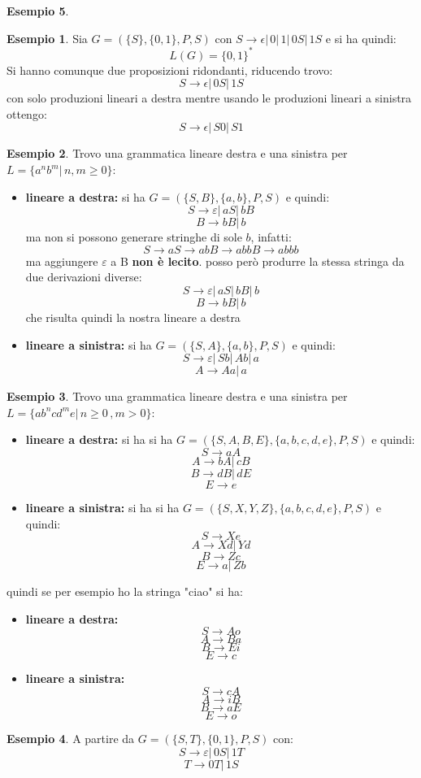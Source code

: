 \documentclass[a4paper]{book}
\theoremstyle{definition}%
\newtheorem*{esempio}{Esempio}
\begin{document}
\begin{esempio}
\begin{esempio}
Sia $G=(\{S\},\{0,1\},P,S)$ con $S\to \epsilon|\,0|\,1|\,0S|\,1S$ e si ha quindi:
\[ L(G)=\{0,1\}^* \]
Si hanno comunque due proposizioni ridondanti, riducendo trovo:
\[ S\to \epsilon|\, 0S|\,1S \]
con solo produzioni lineari a destra mentre usando le produzioni lineari a sinistra ottengo:
\[ S\to \epsilon|\, S0|\,S1 \]
\end{esempio}
\begin{esempio}
Trovo una grammatica lineare destra e una sinistra per $L=\{a^nb^m|\,n,m\geq 0\}$:
\begin{itemize}
\item \textbf{lineare a destra:} si ha $G=(\{S,B\},\{a,b\},P,S)$ e quindi:
$$S\to \varepsilon|\,aS|\,bB$$
$$B\to bB|\,b$$
ma non si possono generare stringhe di sole $b$, infatti:
$$S\to aS\to abB\to abbB\to abbb$$
ma aggiungere $\varepsilon$ a B \textbf{non è lecito}. posso però produrre la stessa stringa da due derivazioni diverse:
$$S\to \varepsilon|\,aS|\,bB|\,b$$
$$B\to bB|\,b$$
che risulta quindi la nostra lineare a destra
\item \textbf{lineare a sinistra:} si ha $G=(\{S,A\},\{a,b\},P,S)$ e quindi:
$$S\to \varepsilon|\,Sb|\,Ab|\,a$$
$$A\to Aa|\,a$$
\end{itemize}
\end{esempio}
\begin{esempio}
Trovo una grammatica lineare destra e una sinistra per $L=\{ab^ncd^me|\,n\geq 0\,,m> 0\}$:
\begin{itemize}
\item \textbf{lineare a destra:} si ha  si ha $G=(\{S,A,B,E\},\{a,b,c,d,e\},P,S)$ e quindi:
$$S\to aA$$
$$A\to bA|\,cB$$
$$B\to dB|\, dE$$
$$E\to e$$
\item \textbf{lineare a sinistra:} si ha  si ha $G=(\{S,X,Y,Z\},\{a,b,c,d,e\},P,S)$ e quindi:
$$S\to Xe$$
$$A\to Xd|\,Yd$$
$$B\to Zc$$
$$E\to a|\,Zb$$
\end{itemize}
quindi se per esempio ho la stringa "ciao" si ha:
\begin{itemize}
\item \textbf{lineare a destra:}
$$S\to Ao$$
$$A\to Ba$$
$$B\to Ei$$
$$E\to c$$
\item \textbf{lineare a sinistra:} 
$$S\to cA$$
$$A\to iB$$
$$B\to aE$$
$$E\to o$$
\end{itemize}
\end{esempio}
\begin{esempio}
A partire da $G=(\{S,T\},\{0,1\},P,S)$ con:
$$S\to\varepsilon|\,0S|\,1T$$
$$T\to 0T|\,1S$$


\end{esempio}
\end{esempio}
\end{document}
